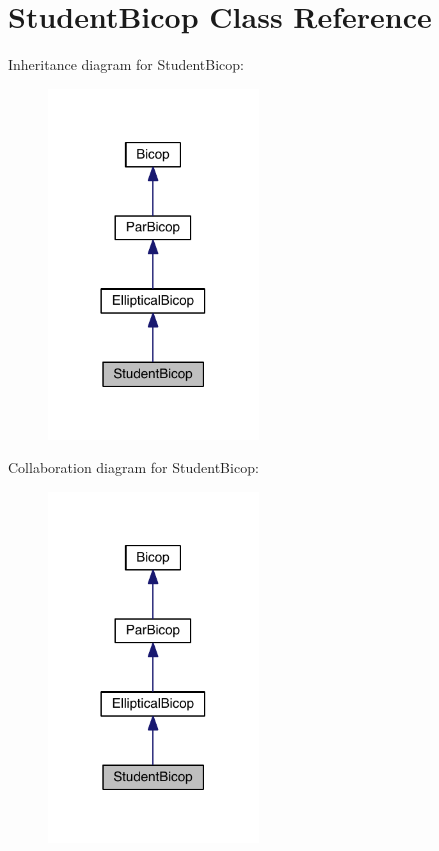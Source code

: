\hypertarget{class_student_bicop}{}\section{Student\+Bicop Class Reference}
\label{class_student_bicop}


Inheritance diagram for Student\+Bicop\+:
\nopagebreak
\begin{figure}[H]
\begin{center}
\leavevmode
\includegraphics[width=158pt]{class_student_bicop__inherit__graph}
\end{center}
\end{figure}


Collaboration diagram for Student\+Bicop\+:
\nopagebreak
\begin{figure}[H]
\begin{center}
\leavevmode
\includegraphics[width=158pt]{class_student_bicop__coll__graph}
\end{center}
\end{figure}

